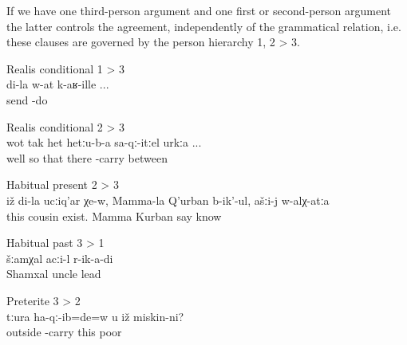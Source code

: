 If we have one third-person argument and one first or second-person argument the latter controls the agreement, independently of the grammatical relation, i.e. these clauses are governed by the person hierarchy 1, 2 > 3. 
%
\begin{exe}
	\ex	Realis conditional 1 > 3\\	\label{ex:‎‎If (I) send my (brother) RC13}
	\gll	di-la	w-at	k-aʁ-ille ...\\
			send		-do\\
	\glt	{}

	\ex	Realis conditional 2 > 3\\	\label{ex:‎‎‎like this, if (you) put this here, in the middle RC23}
	\gll	wot	tak	het	hetːu-b-a	sa-qː-itːel	urkːa ...\\
		well	so	that	there	-carry	between\\
	\glt	{}

	\ex	Habitual present 2 > 3\\	\label{ex:‎‎‎I have a cousin called Mamala Kurban, you know him HP 23}
	\gll	iž	di-la	ucːiq'ar	χe-w,	Mamma-la	Q'urban	b-ik'-ul,	ašːi-j	w-alχ-atːa\\
		this		cousin	exist.	Mamma	Kurban	say				know\\
	\glt	{}

	\ex	Habitual past 3 > 1\\	\label{ex:‎‎‎Uncle Shamkhal led me HB31}
	\gll	šːamχal	acːi-l	r-ik-a-di\\
		Shamxal	uncle	lead\\
	\glt	{}

	\ex	Preterite 3 > 2\\		\label{ex:Did the poor man pull you out PT32}
	\gll	tːura	ha-qː-ib=de=w	u	iž	miskin-ni?\\
		outside	-carry		this	poor\\
	\glt	{}
\end{exe}

